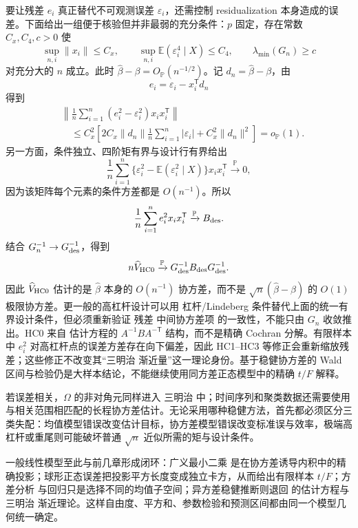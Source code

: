 \begin{proposition}[残差外积替代误差外积的一致性]
要让残差 $e_i$ 真正替代不可观测误差 $\varepsilon_i$，还需控制 residualization 本身造成的误差。下面给出一组便于核验但并非最弱的充分条件：$p$ 固定，存在常数 $C_x,C_4,c>0$ 使
\[
 \sup_{n,i}\|x_i\|\le C_x,
 \qquad
 \sup_{n,i}\mathbb E(\varepsilon_i^4\mid X)\le C_4,
 \qquad
 \lambda_{\min}(G_n)\ge c
\]
对充分大的 $n$ 成立。此时 $\widehat\beta-\beta=O_{\mathbb P}(n^{-1/2})$。记 $d_n=\widehat\beta-\beta$，由
\[
 e_i=\varepsilon_i-x_i^{\mathsf T}d_n
\]
得到
\begin{align*}
 &\left\|
 \frac1n\sum_{i=1}^n
 (e_i^2-\varepsilon_i^2)x_ix_i^{\mathsf T}
 \right\|\\
 &\quad\le
 C_x^2\left[
 2C_x\|d_n\|\frac1n\sum_{i=1}^n|\varepsilon_i|
 +C_x^2\|d_n\|^2
 \right]
 =o_{\mathbb P}(1).
\end{align*}
另一方面，条件独立、四阶矩有界与设计行有界给出
\[
 \frac1n\sum_{i=1}^n
 \{\varepsilon_i^2-\mathbb E(\varepsilon_i^2\mid X)\}
 x_ix_i^{\mathsf T}
 \xrightarrow{\mathbb P}0,
\]
因为该矩阵每个元素的条件方差都是 $O(n^{-1})$。所以
\[
 \frac1n\sum_{i=1}^ne_i^2x_ix_i^{\mathsf T}
 \xrightarrow{\mathbb P} B_{\rm des}.
\]
结合 $G_n^{-1}\to G_{\rm des}^{-1}$，得到
\[
 n\widehat V_{\rm HC0}
 \xrightarrow{\mathbb P}
 G_{\rm des}^{-1}B_{\rm des}G_{\rm des}^{-1}.
\]
因此 $\widehat V_{\rm HC0}$ 估计的是 $\widehat\beta$ 本身的 $O(n^{-1})$ 协方差，而不是 $\sqrt n(\widehat\beta-\beta)$ 的 $O(1)$ 极限协方差。更一般的高杠杆设计可以用 杠杆/Lindeberg 条件替代上面的统一有界设计条件，但必须重新验证 残差 中间协方差项 的一致性，不能只由 $G_n$ 收敛推出。HC0 来自  估计方程的 $A^{-1}BA^{-\mathsf T}$ 结构，而不是精确 Cochran 分解。有限样本中 $e_i^2$ 对高杠杆点的误差方差存在向下偏差，因此 HC1--HC3 等修正会重新缩放残差；这些修正不改变其“三明治 渐近量”这一理论身份。基于稳健协方差的 Wald 区间与检验仍是大样本结论，不能继续使用同方差正态模型中的精确 $t/F$ 解释。
\end{proposition}

\begin{note}[相关误差与三类模型失配]
若误差相关，$\Omega$ 的非对角元同样进入 三明治 中；时间序列和聚类数据还需要使用与相关范围相匹配的长程协方差估计。无论采用哪种稳健方法，首先都必须区分三类失配：均值模型错误改变估计目标，协方差模型错误改变标准误与效率，极端高杠杆或重尾则可能破坏普通 $\sqrt n$ 近似所需的矩与设计条件。
\end{note}

一般线性模型至此与前几章形成闭环：广义最小二乘 是在协方差诱导内积中的精确投影；球形正态误差把投影平方长度变成独立卡方，从而给出有限样本 $t/F$；方差分析 与回归只是选择不同的均值子空间；异方差稳健推断则退回  的估计方程与 三明治 渐近理论。这样自由度、平方和、参数检验和预测区间都由同一个模型几何统一确定。

